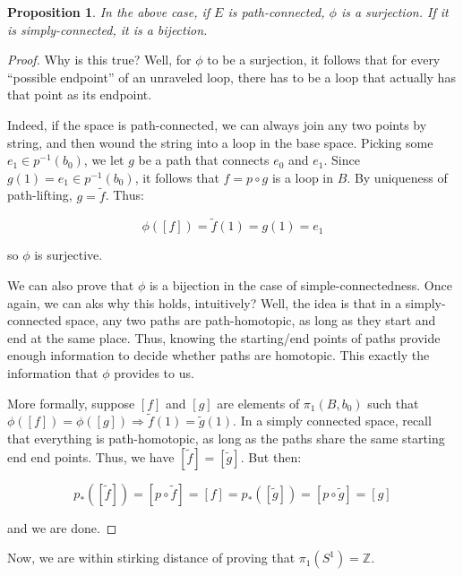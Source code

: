 \documentclass[10pt, oneside]{amsart}
\newtheorem{prop}{Proposition}
\begin{document}
    \begin{prop}
      In the above case, if $E$ is path-connected, $\phi$ is a surjection. If it is simply-connected, it is a bijection.
    \end{prop}

    \begin{proof}
    Why is this true? Well, for $\phi$ to be a surjection, it follows that for every ``possible endpoint'' of an unraveled loop, there has to be a loop that actually has that
    point as its endpoint.
    \newline

    Indeed, if the space is path-connected, we can always join any two points by string, and then wound the string into a loop in the base space. Picking some $e_1 \in p^{-1}(b_0)$, we let
    $g$ be a path that connects $e_0$ and $e_1$. Since $g(1) = e_1 \in p^{-1}(b_0)$, it follows that $f = p \circ g$ is a loop in $B$. By uniqueness of path-lifting, $g = \tilde{f}$. Thus:

    $$\phi([f]) = \tilde{f}(1) = g(1) = e_1$$

    so $\phi$ is surjective.
    \newline

    We can also prove that $\phi$ is a bijection in the case of simple-connectedness. Once again, we can aks why this holds, intuitively? Well, the idea is that in a simply-connected space, any two paths
    are path-homotopic, as long as they start and end at the same place. Thus, knowing the starting/end points of paths provide enough information to decide whether paths are homotopic. This exactly the information
    that $\phi$ provides to us.
    \newline

    More formally, suppose $[f]$ and $[g]$ are elements of $\pi_1(B, b_0)$ such that $\phi([f]) = \phi([g]) \Rightarrow \tilde{f}(1) = \tilde{g}(1)$. In a simply connected space, recall that everything is path-homotopic,
    as long as the paths share the same starting end end points. Thus, we have $[\tilde{f}] = [\tilde{g}]$. But then:

    $$p_{*}([\tilde{f}]) = [p \circ \tilde{f}] = [f] = p_{*}([\tilde{g}]) = [p \circ \tilde{g}] = [g]$$

    and we are done.
    \end{proof}

    Now, we are within stirking distance of proving that $\pi_1(S^1) = \mathbb{Z}$.
    \newline
\end{document}
